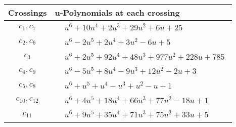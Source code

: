 \documentclass[1p]{elsarticle_modified}
\theoremstyle{definition}
\begin{document}
\begin{tabular}{m{50pt}|m{274pt}}
Crossings & \hspace{64pt}u-Polynomials at each crossing \\
\hline $$\begin{aligned}c_{1},c_{7}\end{aligned}$$&$\begin{aligned}
&u^6+10 u^4+2 u^3+29 u^2+6 u+25
\end{aligned}$\\
\hline $$\begin{aligned}c_{2},c_{6}\end{aligned}$$&$\begin{aligned}
&u^6-2 u^5+2 u^4+3 u^2-6 u+5
\end{aligned}$\\
\hline $$\begin{aligned}c_{3}\end{aligned}$$&$\begin{aligned}
&u^6+2 u^5+92 u^4+48 u^3+977 u^2+228 u+785
\end{aligned}$\\
\hline $$\begin{aligned}c_{4},c_{9}\end{aligned}$$&$\begin{aligned}
&u^6-5 u^5+8 u^4-9 u^3+12 u^2-2 u+3
\end{aligned}$\\
\hline $$\begin{aligned}c_{5},c_{8}\end{aligned}$$&$\begin{aligned}
&u^6+u^5+u^4- u^3+u^2- u+1
\end{aligned}$\\
\hline $$\begin{aligned}c_{10},c_{12}\end{aligned}$$&$\begin{aligned}
&u^6+4 u^5+18 u^4+66 u^3+77 u^2-18 u+1
\end{aligned}$\\
\hline $$\begin{aligned}c_{11}\end{aligned}$$&$\begin{aligned}
&u^6+9 u^5+35 u^4+71 u^3+75 u^2+33 u+5
\end{aligned}$\\
\hline
\end{tabular}\\~\\
\newpage\renewcommand{\arraystretch}{1}
\end{document}

